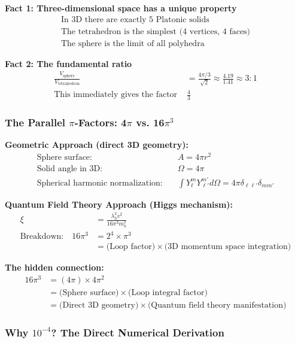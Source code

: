 \documentclass[12pt,a4paper]{article}
\begin{document}
\textbf{Fact 1: Three-dimensional space has a unique property}
\begin{align}
	\text{In 3D there are exactly 5 Platonic solids} \nonumber \\
	\text{The tetrahedron is the simplest (4 vertices, 4 faces)} \nonumber \\
	\text{The sphere is the limit of all polyhedra} \nonumber
\end{align}

\textbf{Fact 2: The fundamental ratio}
\begin{align}
	\frac{V_{\text{sphere}}}{V_{\text{tetrahedron}}} &= \frac{4\pi/3}{\sqrt{2}} \approx \frac{4.19}{1.41} \approx 3:1 \\
	\text{This immediately gives the factor } &\frac{4}{3}
\end{align}

\subsubsection{The Parallel $\pi$-Factors: 4$\pi$ vs. 16$\pi^3$}
\label{subsubsec:parallel_pi_factors}

\textbf{Geometric Approach (direct 3D geometry):}
\begin{align}
	\text{Sphere surface:} \quad &A = 4\pi r^2 \\
	\text{Solid angle in 3D:} \quad &\Omega = 4\pi \\
	\text{Spherical harmonic normalization:} \quad &\int Y_{\ell}^m Y_{\ell'}^{m'} d\Omega = 4\pi \delta_{\ell\ell'}\delta_{mm'}
\end{align}

\textbf{Quantum Field Theory Approach (Higgs mechanism):}
\begin{align}
	\xi &= \frac{\lambda_h^2 v^2}{16\pi^3 m_h^2} \\
	\text{Breakdown:} \quad 16\pi^3 &= 2^4 \times \pi^3 \\
	&= \text{(Loop factor)} \times \text{(3D momentum space integration)}
\end{align}

\textbf{The hidden connection:}
\begin{align}
	16\pi^3 &= (4\pi) \times 4\pi^2 \\
	&= \text{(Sphere surface)} \times \text{(Loop integral factor)} \\
	&= \text{(Direct 3D geometry)} \times \text{(Quantum field theory manifestation)}
\end{align}

\subsubsection{Why $10^{-4}$? The Direct Numerical Derivation}
\label{subsubsec:direct_numerical_derivation}
\end{document}

